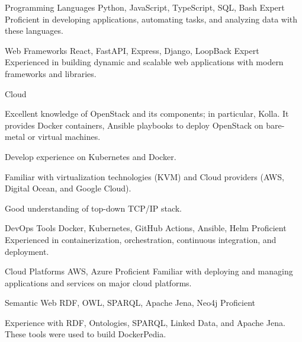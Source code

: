 \begin{cventries}
  \cvskill
  {Programming Languages}
  {Python, JavaScript, TypeScript, SQL, Bash}
  {Expert}
  {Proficient in developing applications, automating tasks, and analyzing data with these languages.}


  \cvskill
  {Web Frameworks}
  {React, FastAPI, Express, Django, LoopBack}
  {Expert}
  {Experienced in building dynamic and scalable web applications with modern frameworks and libraries.}


  \cventry
  {Cloud}
  {}
  {}
  {}
  {
    \begin{cvitems}
      \item {Excellent knowledge of OpenStack and its components; in
                  particular, Kolla. It provides Docker containers, Ansible
                  playbooks to deploy
                  OpenStack on bare-metal or virtual machines.}
      \item {Develop experience on Kubernetes and Docker.}
      \item {Familiar with virtualization technologies (KVM) and Cloud
                  providers (AWS, Digital Ocean, and Google Cloud).}
      \item {Good understanding of top-down TCP/IP stack.}
    \end{cvitems}
  }

  \cvskill
  {DevOps Tools}
  {Docker, Kubernetes, GitHub Actions, Ansible, Helm}
  {Proficient}
  {Experienced in containerization, orchestration, continuous integration, and deployment.}

  \cvskill
  {Cloud Platforms}
  {AWS, Azure}
  {Proficient}
  {Familiar with deploying and managing applications and services on major cloud platforms.}


  \cventry
  {Semantic Web}
  {RDF, OWL, SPARQL, Apache Jena, Neo4j}
  {Proficient}
  {
    \begin{cvitems}
      \item {Experience with RDF, Ontologies, SPARQL, Linked Data, and Apache
                  Jena. These tools were used to build DockerPedia.}
    \end{cvitems}
  }

\end{cventries}